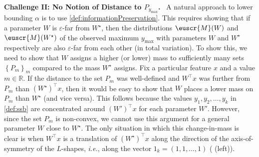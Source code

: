 \documentclass[11pt,letterpaper]{article}
\theoremstyle{plain}
\theoremstyle{definition}
\theoremstyle{remark}
\newcommand{\inbrace}[1]{\ensuremath{\left\{#1\right\}}}
\newcommand{\R}{\mathbb{R}}
\newcommand{\eps}{\varepsilon}
\newcommand{\customcal}[1]{\euscr{#1}}
\newcommand{\cM}{\customcal{M}}
\renewcommand{\paragraph}[1]{\medskip \noindent\textbf{#1}~}
\newcommand{\ie}{\emph{i.e.}}
\newcommand{\Wstar}{{W^\star}}
\newcommand{\ymax}{y_{\max}}
\begin{document}
        
    \paragraph{{Challenge II: No Notion of Distance to $P_{\ymax}$.}} %
            {A natural approach to lower bounding $\alpha$ is to use \cref{def:informationPreservation}. This requires showing that}
            if a parameter $W$ is $\eps$-far from $\Wstar$,
            then the distributions $\cM(W)$ and $\cM(\Wstar)$ of the observed maximum $\ymax$ with parameters $W$ and $\Wstar$ respectively are also $\eps$-far from each other (in total variation).
            To show this, {we need} to show that $W$ assigns a higher (or lower) mass to sufficiently many sets $\inbrace{P_{m}}_m$ compared to the mass $\Wstar$ assigns.
            Fix a particular feature $x$ and a value $m\in \R$.
            If the distance to the set $P_{m}$ was well-defined and $W^\top x$ was further from $P_m$ than $( W^\star)^\top x$, then it would be easy to show that $W$ places a lower mass on $P_m$ than $\Wstar$ (and vice versa).
            This follows because the values $y_1,y_2,\dots,y_k$ in \cref{def:ssb} are concentrated around $(W')^\top x$ for each parameter $W'$.
            However, since {the set} $P_m$ is non-convex, we cannot use this argument for a general parameter $W$ close to $\Wstar$.
            The only situation in which this change-in-mass is clear is when $W^\top x$ is a translation of $(W^\star)^\top x$ along the direction of the axis-of-symmetry of the $L$-shapes, \ie{}, along the vector $1_k = (1,1,\dots,1)$
            ( (left)).
            
\end{document}
